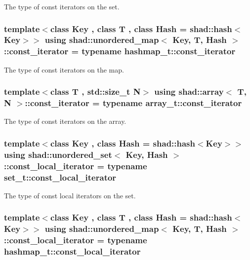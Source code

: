 The type of const iterators on the set. 

\hypertarget{group__Types_ga102c3cd521767bf4b22f3788ccc054e8}{
\subsubsection[{const\-\_\-iterator}]{\setlength{\rightskip}{0pt plus 5cm}template$<$class Key , class T , class Hash  = shad\-::hash$<$\-Key$>$$>$ using {\bf shad\-::unordered\-\_\-map}$<$ Key, T, Hash $>$\-::const\-\_\-iterator =  typename hashmap\-\_\-t\-::const\-\_\-iterator}}\label{group__Types_ga102c3cd521767bf4b22f3788ccc054e8}


The type of const iterators on the map. 

\hypertarget{group__Types_ga2c50f8cbc96829f139f8138f1bac40bf}{
\subsubsection[{const\-\_\-iterator}]{\setlength{\rightskip}{0pt plus 5cm}template$<$class T , std\-::size\-\_\-t N$>$ using {\bf shad\-::array}$<$ T, N $>$\-::const\-\_\-iterator =  typename array\-\_\-t\-::const\-\_\-iterator}}\label{group__Types_ga2c50f8cbc96829f139f8138f1bac40bf}


The type of const iterators on the array. 

\hypertarget{group__Types_gac14878d16fabddc52f8dd35465f3155e}{
\subsubsection[{const\-\_\-local\-\_\-iterator}]{\setlength{\rightskip}{0pt plus 5cm}template$<$class Key , class Hash  = shad\-::hash$<$\-Key$>$$>$ using {\bf shad\-::unordered\-\_\-set}$<$ Key, Hash $>$\-::const\-\_\-local\-\_\-iterator =  typename set\-\_\-t\-::const\-\_\-local\-\_\-iterator}}\label{group__Types_gac14878d16fabddc52f8dd35465f3155e}


The type of const local iterators on the set. 

\hypertarget{group__Types_ga2242fb2071462a5f8a420d8cd8a7d8e8}{
\subsubsection[{const\-\_\-local\-\_\-iterator}]{\setlength{\rightskip}{0pt plus 5cm}template$<$class Key , class T , class Hash  = shad\-::hash$<$\-Key$>$$>$ using {\bf shad\-::unordered\-\_\-map}$<$ Key, T, Hash $>$\-::const\-\_\-local\-\_\-iterator =  typename hashmap\-\_\-t\-::const\-\_\-local\-\_\-iterator}}\label{group__Types_ga2242fb2071462a5f8a420d8cd8a7d8e8}


